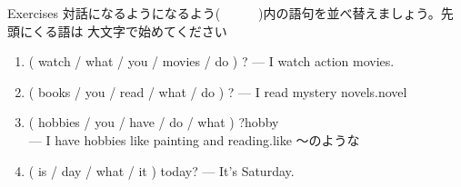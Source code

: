 \documentclass[aspectratio=169,xcolor={dvipsnames,table}]{beamer}
\begin{document}
\begin{frame}[plain]{Exercises}
 対話になるようになるよう(~~~~~~)内の語句を並べ替えましょう。先頭にくる語は
大文字で始めてください
\begin{enumerate}
 \item ( watch / what / you / movies / do ) ? --- I watch action movies.\\
 \item ( books / you / read / what / do ) ? --- I read mystery novels.\hfill{\scriptsize novel }\\
 \item ( hobbies / you / have / do / what ) ?\hfill{}{\scriptsize hobby }\\
\mbox{}\hfill{}--- I have hobbies like painting and reading.\hfill{}{\scriptsize like 〜のような}\\
 \item ( is / day / what / it )  today? --- It's Saturday.\\
\hfill{}
\end{enumerate}
\mbox{}\hfill{\scriptsize {}}

\end{frame}
\end{document}
